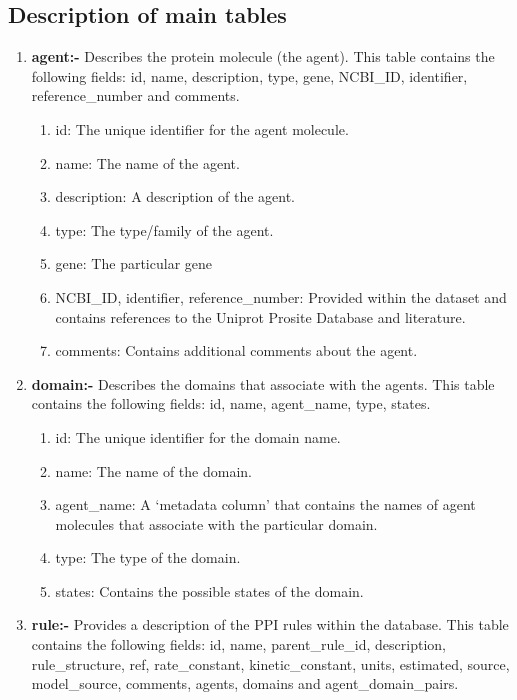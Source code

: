 \documentclass[msc,deptreport,ai]{infthesis}      %
\begin{document}
 \subsection{Description of  main tables}
\begin{enumerate}
	\item \textbf{agent:-} Describes the protein molecule (the agent). This table contains the following fields: id, name, description, type, gene, NCBI\_ID, identifier, reference\_number and comments.
	\begin{enumerate}
		\item id: The unique identifier for the agent molecule.
		\item name: The name of the agent.
		\item description: A description of the agent.
		\item type: The type/family of the agent.
		\item gene: The particular gene
		\item NCBI\_ID, identifier, reference\_number: Provided within the dataset and contains references to the Uniprot Prosite Database \cite{Uniprot-Prosite} and literature.
		\item comments: Contains additional comments about the agent.
	\end{enumerate}
	\item \textbf{domain:-}  Describes the domains that associate with the agents. This table contains the following fields: id, name, agent\_name, type, states. 	
		\begin{enumerate}
		\item id: The unique identifier for the domain name.
		\item name: The name of the domain.
		\item agent\_name: A `metadata column' that contains the names of agent molecules that associate with the particular domain.
		\item type: The type of the domain.
		\item states: Contains the possible states of the domain.
	\end{enumerate}
	\item \textbf{rule:-} Provides a description of the PPI rules within the database. 
	This table contains the following fields: id, name, parent\_rule\_id, description, rule\_structure, ref, rate\_constant, kinetic\_constant, units, estimated, source, model\_source, comments, agents, domains and agent\_domain\_pairs.
	\begin{enumerate}

\end{enumerate}
\end{enumerate}
\end{document}
